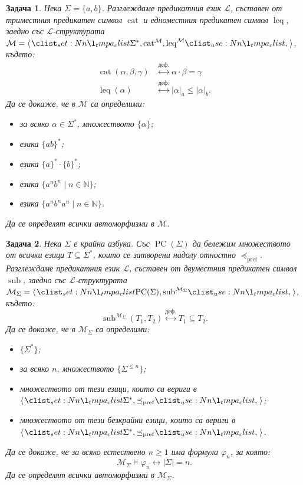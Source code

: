 \documentclass[12pt]{article}
\newcommand{\N}{\mathbb{N}}
\newcommand{\calL}{\mathcal{L}}
\newcommand{\calM}{\mathcal{M}}
\newcommand{\dequiv}{\stackrel{\text{деф.}}{\longleftrightarrow}}
\newtheorem{problem}{Задача}[section]
\theoremstyle{definition}
\begin{document}
\begin{problem}
Нека $\Sigma = \{ a, b \}$.
Разглеждаме предикатния език $\calL$, съставен от триместния предикатен символ $\operatorname{cat}$ и едноместния предикатен символ $\operatorname{leq}$, заедно със $\calL$-структурата $\calM = \opair{\Sigma^*, \operatorname{cat}^\calM, \operatorname{leq}^\calM}$, където:
\begin{align*}
	\operatorname{cat}(\alpha, \beta, \gamma) & \dequiv \alpha \cdot \beta = \gamma \\
	\operatorname{leq}(\alpha)                & \dequiv |\alpha|_a \leq |\alpha|_b.
\end{align*}
Да се докаже, че в $\calM$ са определими:
\begin{itemize}
	\item за всяко $\alpha \in \Sigma^*$, множеството $\{ \alpha \}$;
	\item езика $\{ ab \}^*$;
	\item езика $\{ a \}^* \cdot \{ b \}^*$;
	\item езика $\{ a^n b^n \mid n \in \N \}$;
	\item езика $\{ a^n b^n a^n \mid n \in \N \}$.
\end{itemize}
Да се определят всички автоморфизми в $\calM$.
\end{problem}

\newpage 

\begin{problem}
Нека $\Sigma$ е крайна азбука.
Със $\operatorname{PC}(\Sigma)$ да бележим множеството от всички езици $T \subseteq \Sigma^*$, които се затворени надолу отностно $\preceq_{\operatorname{pref}}$.
Разглеждаме предикатния език $\calL$, съставен от двуместния предикатен символ $\operatorname{sub}$, заедно със $\calL$-структурата $\calM_\Sigma = \opair{\operatorname{PC}(\Sigma), \operatorname{sub}^{\calM_\Sigma}}$, където:
\[
  \operatorname{sub}^{\calM_\Sigma}(T_1, T_2) \dequiv T_1 \subseteq T_2.
\]
Да се докаже, че в $\calM_\Sigma$ са определими:
\begin{itemize}
  \item $\{ \Sigma^* \}$;
  \item за всяко $n$, множеството $\{ \Sigma^{\leq n} \}$;
  \item множеството от тези езици, които са вериги в $\opair{\Sigma^*, \preceq_{\operatorname{pref}}}$;
  \item множеството от тези безкрайни езици, които са вериги в $\opair{\Sigma^*, \preceq_{\operatorname{pref}}}$.
\end{itemize}
Да се докаже, че за всяко естествено $n \geq 1$ има формула $\varphi_n$, за която:
\[
  \calM_\Sigma \models \varphi_n \longleftrightarrow |\Sigma| = n.
\]
Да се определят всички автоморфизми в $\calM_\Sigma$.
\end{problem}
\end{document}
